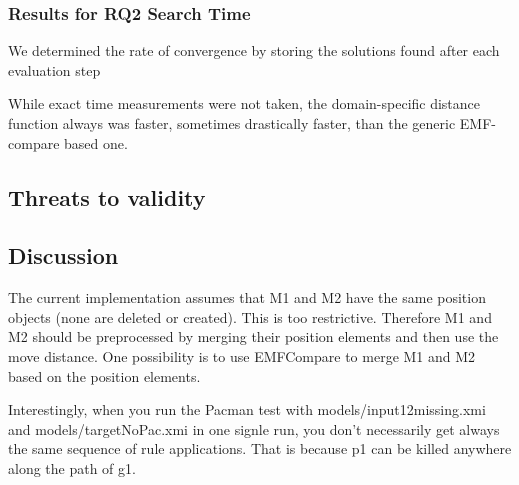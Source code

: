 
\subsubsection{Results for RQ2 Search Time}

We determined the rate of convergence by storing the solutions found after each evaluation step





While exact time measurements were not taken, the domain-specific distance function always was faster, sometimes drastically faster,
than the generic EMF-compare based one.


\subsection{Threats to validity}

\subsection{Discussion}
The current implementation assumes that M1 and M2 have the same position objects (none are deleted or created). This is too restrictive. Therefore M1 and M2 should be preprocessed by merging their position elements and then use the move distance. One possibility is to use EMFCompare to merge M1 and M2 based on the position elements.

Interestingly, when you run the Pacman test with models/input12missing.xmi and models/targetNoPac.xmi in one signle run, you don't necessarily get always the same sequence of rule applications. That is because p1 can be killed anywhere along the path of g1. 